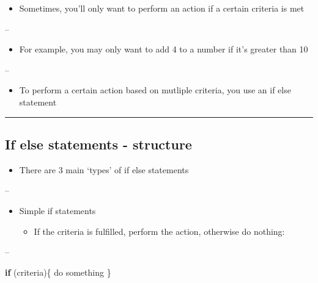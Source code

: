 \documentclass[]{article}
\newenvironment{Shaded}{\begin{snugshade}}{\end{snugshade}}
\newcommand{\ControlFlowTok}[1]{\textcolor[rgb]{0.13,0.29,0.53}{\textbf{#1}}}
\newcommand{\NormalTok}[1]{#1}
\providecommand{\tightlist}{%
  \setlength{\itemsep}{0pt}\setlength{\parskip}{0pt}}
\begin{document}
\begin{itemize}
\tightlist
\item
  Sometimes, you'll only want to perform an action if a certain criteria
  is met
\end{itemize}

--

\begin{itemize}
\tightlist
\item
  For example, you may only want to add 4 to a number if it's greater
  than 10
\end{itemize}

--

\begin{itemize}
\tightlist
\item
  To perform a certain action based on mutliple criteria, you use an if
  else statement
\end{itemize}

\begin{center}\rule{0.5\linewidth}{\linethickness}\end{center}

\hypertarget{if-else-statements---structure}{%
\subsection{If else statements -
structure}\label{if-else-statements---structure}}

\begin{itemize}
\tightlist
\item
  There are 3 main `types' of if else statements
\end{itemize}

--

\begin{itemize}
\tightlist
\item
  Simple if statements

  \begin{itemize}
  \tightlist
  \item
    If the criteria is fulfilled, perform the action, otherwise do
    nothing:
  \end{itemize}
\end{itemize}

--

\begin{Shaded}
\begin{Highlighting}[]
\ControlFlowTok{if}\NormalTok{ (criteria)\{}
\NormalTok{  do something}
\NormalTok{\}}
\end{Highlighting}
\end{Shaded}
\end{document}
